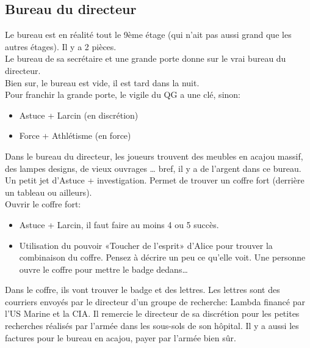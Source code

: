 \documentclass[oneside,12pt]{book}
\begin{document}
\begin{flushleft}
\section{Bureau du directeur}
Le bureau est en réalité tout le 9ème étage (qui n'ait pas aussi grand que les autres étages). Il y a 2 pièces.\\
Le bureau de sa secrétaire et une grande porte donne sur le vrai bureau du directeur. \\
Bien sur, le bureau est vide, il est tard dans la nuit.\\
\vspace{0.5cm}
Pour franchir la grande porte, le vigile du QG a une clé, sinon:\\
\begin{itemize}
\item Astuce + Larcin (en discrétion)
\item Force + Athlétisme (en force)
\end{itemize}

Dans le bureau du directeur, les joueurs trouvent des meubles en acajou massif, des lampes designs, de vieux ouvrages … bref, il y a de l'argent dans ce bureau.\\
Un petit jet d'Astuce + investigation. Permet de trouver un coffre fort (derrière un tableau ou ailleurs). \\

\vspace{0.5cm}
Ouvrir le coffre fort: \\
\begin{itemize}
\item Astuce + Larcin, il faut faire au moins 4 ou 5 succès.
\item Utilisation du pouvoir «Toucher de l'esprit» d'Alice pour trouver la combinaison du coffre. Pensez à décrire un peu ce qu'elle voit. Une personne ouvre le coffre pour mettre le badge dedans…
\end{itemize}
\vspace{0.5cm}
Dans le coffre, ils vont trouver le badge et des lettres. Les lettres sont des courriers envoyés par le directeur d'un groupe de recherche: Lambda financé par l'US Marine et la CIA. Il remercie le directeur de sa discrétion pour les petites recherches réalisés par l'armée dans les sous-sols de son hôpital. Il y a aussi les factures pour le bureau en acajou, payer par l'armée bien sûr.


\end{flushleft}
\end{document}
